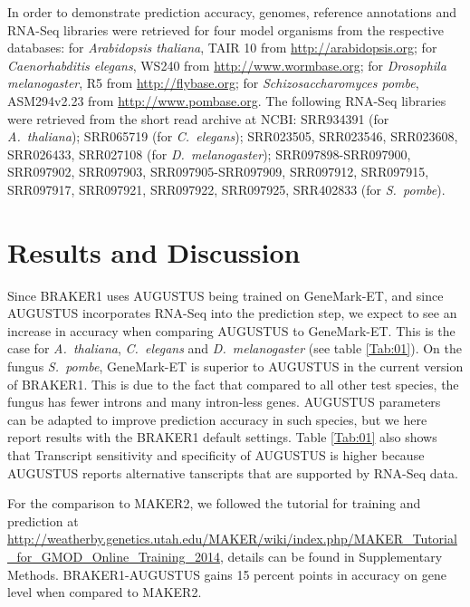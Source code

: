 \documentclass{bioinfo}
\begin{document}
\begin{methods}
In order to demonstrate prediction accuracy, genomes, reference annotations and RNA-Seq libraries were retrieved for four model organisms from the respective databases: for \textit{Arabidopsis thaliana}, TAIR 10 from \url{http://arabidopsis.org}; for \textit{Caenorhabditis elegans}, WS240 from \url{http://www.wormbase.org}; for \textit{Drosophila melanogaster}, R5 from \url{http://flybase.org}; for \textit{Schizosaccharomyces pombe}, ASM294v2.23 from \url{http://www.pombase.org}. The following RNA-Seq libraries were retrieved from the short read archive at NCBI: SRR934391 (for \textit{A.~thaliana}); SRR065719 (for \textit{C.~elegans}); SRR023505, SRR023546, SRR023608, SRR026433, SRR027108 (for \textit{D.~melanogaster}); SRR097898-SRR097900, SRR097902, SRR097903,
SRR097905-SRR097909, SRR097912, SRR097915, SRR097917, SRR097921, SRR097922, SRR097925, SRR402833 (for \textit{S.~pombe}).



\end{methods}


\section{Results and Discussion}

Since BRAKER1 uses AUGUSTUS being trained on GeneMark-ET, and since AUGUSTUS incorporates RNA-Seq into the prediction step, we expect to see an increase in accuracy when comparing AUGUSTUS to GeneMark-ET. This is the case for \textit{A.~thaliana}, \textit{C.~elegans} and \textit{D.~melanogaster} (see table \ref{Tab:01}). On the fungus \textit{S.~pombe}, GeneMark-ET is superior to AUGUSTUS in the current version of BRAKER1. This is due to the fact that compared to all other test species, the fungus has fewer introns and many intron-less genes. AUGUSTUS parameters can be adapted to improve prediction accuracy in such species, but we here report results with the BRAKER1 default settings. Table \ref{Tab:01} also shows that Transcript sensitivity and specificity of AUGUSTUS is higher because AUGUSTUS reports alternative tanscripts that are supported by RNA-Seq data. 

For the comparison to MAKER2, we followed the tutorial for training and prediction at 
\url{http://weatherby.genetics.utah.edu/MAKER/wiki/index.php/MAKER_Tutorial_for_GMOD_Online_Training_2014}, details can be found in Supplementary Methods. BRAKER1-AUGUSTUS gains 15 percent points in accuracy on gene level when compared to MAKER2. 
\end{document}
